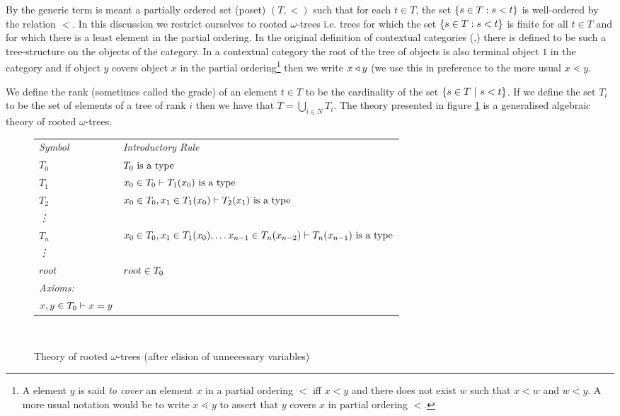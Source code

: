 \note 
By  the generic term  is meant a partially ordered set (poset) $(T, <)$ such that for each $t \in T$, the set $\left\{s \in T : s < t\right\}$ is well-ordered by the relation $<$.
In this discussion we restrict ourselves to rooted $\omega$-trees i.e. trees for which the set $\left\{s \in T : s < t\right\}$
is finite for all $t \in T$ and for which there is a least element in the partial ordering. 
In the original definition
of contextual categories (\cite{Cartmell78,Cartmell86},) there is defined to be such a tree-structure on the objects of the category. In a contextual category the root of the tree of objects is also  terminal object $1$
in the category and if object $y$ covers object $x$ in the partial ordering\footnote{A element $y$ is said \textit{to cover} 
an element $x$ in a partial ordering $<$ iff $x<y$ and there does not exist $w$ such that $x < w$ and $w < y$.
A more usual notation would be to write $x \lessdot y$ to assert that $y$ covers $x$ in partial ordering $<$. }
then we write $x \triangleleft y$ (we use this in preference to the more usual $x \lessdot y$. 

We define the rank (sometimes called the grade) of an element $t \in T$ to be the cardinality
of the set $\left\{s \in T \ \middle|\ s < t\right\}$. If we define the set $T_i$ to be the set of elements of a tree
of rank $i$ then we have that $T= \bigcup_{i \in N}T_i$. 
The theory presented in figure \ref{theoryoftrees} is a generalised algebraic theory of rooted $\omega$-trees.\\
\newcommand{\Sz}{T_0}
\newcommand{\ofS}[1]{\ofT{#1}{\Sz}}
\newcommand{\Si}[1]{T_{#1}}
\newcommand{\ofSi}[3]{\ofT{#1}{\Si{#2}(#3)}}
\begin{figure}[H]
\caption{Theory of rooted $\omega$-trees (after elision of unnecessary variables)}
\label{theoryoftrees}
\begin{tabular}{>{\itshape}l l}
Symbol & \itshape{Introductory Rule} \\
$\Sz  $&$\isT{\Sz}$\\
$\Si{1} $&$\ofS{x_0} \tstyle \isT{\Si{1}(x_0)} $\\
$\Si{2} $&$\ofS{x_0},\ofSi{x_1}{1}{x_0} \tstyle \isT{\Si{2}(x_1)} $\\
\vdots  \\
$\Si{n} $&$\ofS{x_0},\ofSi{x_1}{1}{x_0}, \hdots \ofSi{x_{n-1}}{n}{ x_{n-2}} \tstyle \isT{\Si{n}(x_{n-1})} $\\
\vdots   \\
$root$ & $\ofT{root}{\Sz}$ \\
\itshape{Axioms}:  \\
$\ofT{x,y}{\Sz} \tstyle x = y$
\end{tabular} \\
\end{figure}
\newcommand{\bbin}[1]{
\raisebox{-0.5em}{$\stackrel{\displaystyle{\in}} {\scriptstyle{#1}}$}
}
\newcommand{\ofTn}[3]{
#1 \bbin{#2} #3}

